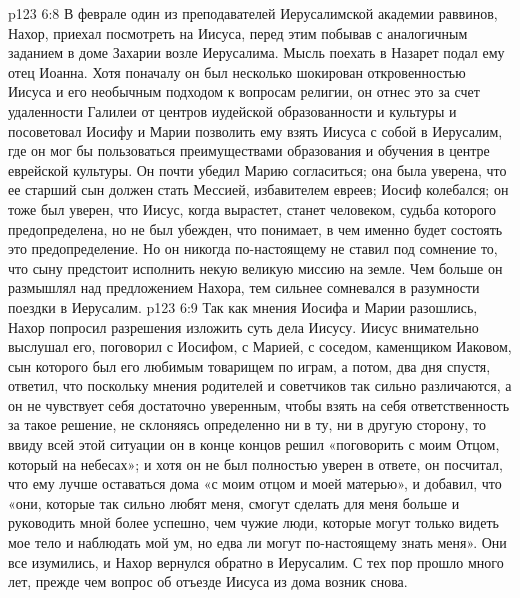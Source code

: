 \vs p123 6:8 \pc В феврале один из преподавателей Иерусалимской академии раввинов, Нахор, приехал посмотреть на Иисуса, перед этим побывав с аналогичным заданием в доме Захарии возле Иерусалима. Мысль поехать в Назарет подал ему отец Иоанна. Хотя поначалу он был несколько шокирован откровенностью Иисуса и его необычным подходом к вопросам религии, он отнес это за счет удаленности Галилеи от центров иудейской образованности и культуры и посоветовал Иосифу и Марии позволить ему взять Иисуса с собой в Иерусалим, где он мог бы пользоваться преимуществами образования и обучения в центре еврейской культуры. Он почти убедил Марию согласиться; она была уверена, что ее старший сын должен стать Мессией, избавителем евреев; Иосиф колебался; он тоже был уверен, что Иисус, когда вырастет, станет человеком, судьба которого предопределена, но не был убежден, что понимает, в чем именно будет состоять это предопределение. Но он никогда по\hyp{}настоящему не ставил под сомнение то, что сыну предстоит исполнить некую великую миссию на земле. Чем больше он размышлял над предложением Нахора, тем сильнее сомневался в разумности поездки в Иерусалим.
\vs p123 6:9 Так как мнения Иосифа и Марии разошлись, Нахор попросил разрешения изложить суть дела Иисусу. Иисус внимательно выслушал его, поговорил с Иосифом, с Марией, с соседом, каменщиком Иаковом, сын которого был его любимым товарищем по играм, а потом, два дня спустя, ответил, что поскольку мнения родителей и советчиков так сильно различаются, а он не чувствует себя достаточно уверенным, чтобы взять на себя ответственность за такое решение, не склоняясь определенно ни в ту, ни в другую сторону, то ввиду всей этой ситуации он в конце концов решил «поговорить с моим Отцом, который на небесах»; и хотя он не был полностью уверен в ответе, он посчитал, что ему лучше оставаться дома «с моим отцом и моей матерью», и добавил, что «они, которые так сильно любят меня, смогут сделать для меня больше и руководить мной более успешно, чем чужие люди, которые могут только видеть мое тело и наблюдать мой ум, но едва ли могут по\hyp{}настоящему знать меня». Они все изумились, и Нахор вернулся обратно в Иерусалим. С тех пор прошло много лет, прежде чем вопрос об отъезде Иисуса из дома возник снова.
